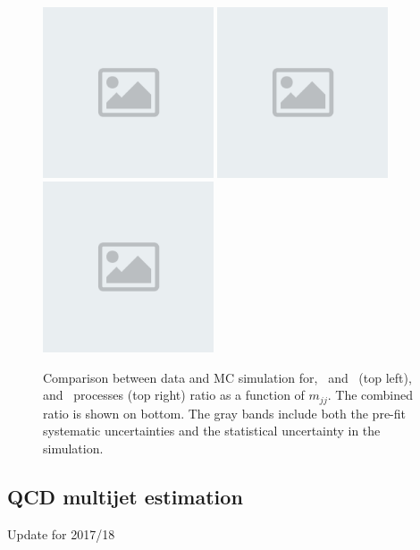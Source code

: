 \begin{figure}[htbp]
  \centering
  \includegraphics[width=0.45\textwidth]{placeholder.png}
  \includegraphics[width=0.45\textwidth]{placeholder.png}
  \includegraphics[width=0.45\textwidth]{placeholder.png}
  \caption{Comparison between data and MC simulation for, 
     \Zmmjets~and \Wmnjets~(top left), \Zeejets and \Wenjets~processes (top right) ratio  as a function of $m_{jj}$. The combined ratio is shown on bottom.
     The gray bands include both the pre-fit systematic uncertainties and the statistical 
     uncertainty in the simulation. }
  \label{fig:Ratio}
\end{figure}


\subsection{QCD multijet estimation}
{\color{red} Update for 2017/18}
